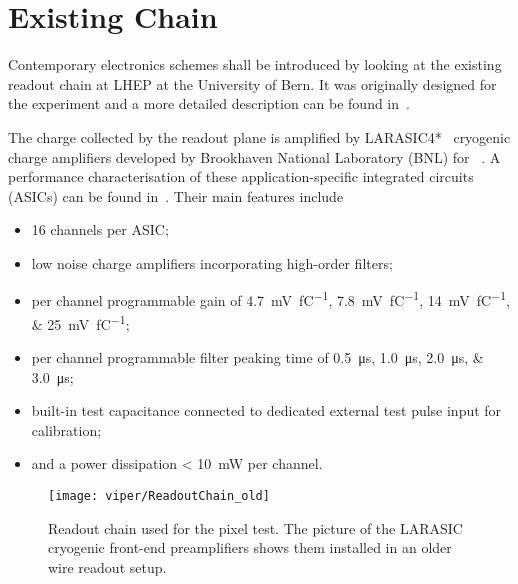 
\section{Existing Chain}
\label{sec:electronics_existing}
Contemporary electronics schemes shall be introduced by looking at the existing readout chain at LHEP at the University of Bern.
It was originally designed for the \AT{} experiment and a more detailed description can be found in~\cite{AT_larasic}.

The charge collected by the readout plane is amplified by LARASIC4*~\cite{larasic} cryogenic charge amplifiers developed by Brookhaven National Laboratory (BNL) for \uboone{}~\cite{uboone}.
A performance characterisation of these application-specific integrated circuits (ASICs) can be found in~\cite{AT_larasic}.
Their main features include

\begin{itemize}
	\item \num{16} channels per ASIC;
	\item low noise charge amplifiers incorporating high-order filters;
	\item per channel programmable gain of \SIlist[list-final-separator = { or }]{4.7; 7.8; 14; 25}{\milli\volt\per\femto\coulomb};
	\item per channel programmable filter peaking time of \SIlist[list-final-separator = { or }]{0.5; 1.0; 2.0; 3.0}{\micro\second};
	\item built-in test capacitance connected to dedicated external test pulse input for calibration;
	\item and a power dissipation \SI{< 10}{\milli\watt} per channel.
\end{itemize}

\begin{figure}[htb]
	\centering
	\texttt{[image: viper/ReadoutChain\_old]}
	\caption{Readout chain used for the pixel test. The picture of the LARASIC cryogenic front-end preamplifiers shows them installed in an older wire readout setup.~\cite{AT_larasic}}
	\label{fig:viper_readoutChain_old}
\end{figure}

